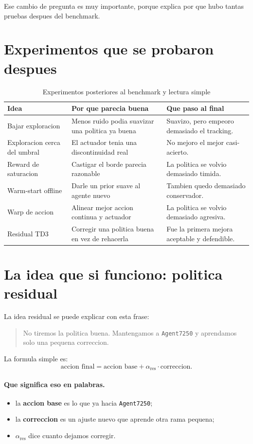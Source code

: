 \documentclass[11pt,a4paper]{article}
\begin{document}
Ese cambio de pregunta es muy importante, porque explica por que hubo tantas pruebas despues del benchmark.

\section{Experimentos que se probaron despues}

\begin{table}[H]
\centering
\caption{Experimentos posteriores al benchmark y lectura simple}
\small
\begin{tabularx}{\linewidth}{@{}L{3.2cm}Y Y@{}}
\toprule
Idea & Por que parecia buena & Que paso al final \\
\midrule
Bajar exploracion & Menos ruido podia suavizar una politica ya buena & Suavizo, pero empeoro demasiado el tracking. \\
Exploracion cerca del umbral & El actuador tenia una discontinuidad real & No mejoro el mejor casi-acierto. \\
Reward de saturacion & Castigar el borde parecia razonable & La politica se volvio demasiado timida. \\
Warm-start offline & Darle un prior suave al agente nuevo & Tambien quedo demasiado conservador. \\
Warp de accion & Alinear mejor accion continua y actuador & La politica se volvio demasiado agresiva. \\
Residual TD3 & Corregir una politica buena en vez de rehacerla & Fue la primera mejora aceptable y defendible. \\
\bottomrule
\end{tabularx}
\end{table}

\section{La idea que si funciono: politica residual}

La idea residual se puede explicar con esta frase:

\begin{quote}
No tiremos la politica buena. Mantengamos a \texttt{Agent7250} y aprendamos solo una pequena correccion.
\end{quote}

La formula simple es:
\[
\text{accion final} = \text{accion base} + \alpha_{\mathrm{res}} \cdot \text{correccion}.
\]

\paragraph{Que significa eso en palabras.}
\begin{itemize}[leftmargin=1.5em]
\item la \textbf{accion base} es lo que ya hacia \texttt{Agent7250};
\item la \textbf{correccion} es un ajuste nuevo que aprende otra rama pequena;
\item \(\alpha_{\mathrm{res}}\) dice cuanto dejamos corregir.
\end{itemize}
\end{document}
